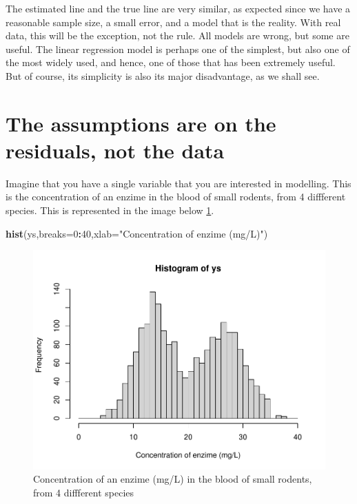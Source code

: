 \documentclass[
]{book}
\newenvironment{Shaded}{\begin{snugshade}}{\end{snugshade}}
\newcommand{\DataTypeTok}[1]{\textcolor[rgb]{0.13,0.29,0.53}{#1}}
\newcommand{\DecValTok}[1]{\textcolor[rgb]{0.00,0.00,0.81}{#1}}
\newcommand{\KeywordTok}[1]{\textcolor[rgb]{0.13,0.29,0.53}{\textbf{#1}}}
\newcommand{\NormalTok}[1]{#1}
\newcommand{\OperatorTok}[1]{\textcolor[rgb]{0.81,0.36,0.00}{\textbf{#1}}}
\newcommand{\StringTok}[1]{\textcolor[rgb]{0.31,0.60,0.02}{#1}}
\begin{document}
The estimated line and the true line are very similar, as expected since we have a reasonable sample size, a small error, and a model that is the reality. With real data, this will be the exception, not the rule. All models are wrong, but some are useful. The linear regression model is perhaps one of the simplest, but also one of the most widely used, and hence, one of those that has been extremely useful. But of course, its simplicity is also its major disadvantage, as we shall see.

\hypertarget{the-assumptions-are-on-the-residuals-not-the-data}{%
\section{The assumptions are on the residuals, not the data}\label{the-assumptions-are-on-the-residuals-not-the-data}}

Imagine that you have a single variable that you are interested in modelling. This is the concentration of an enzime in the blood of small rodents, from 4 diffferent species. This is represented in the image below \ref{fig:figrodents}.

\begin{Shaded}
\begin{Highlighting}[]
\KeywordTok{hist}\NormalTok{(ys,}\DataTypeTok{breaks=}\DecValTok{0}\OperatorTok{:}\DecValTok{40}\NormalTok{,}\DataTypeTok{xlab=}\StringTok{"Concentration of enzime (mg/L)"}\NormalTok{)}
\end{Highlighting}
\end{Shaded}

\begin{figure}

{\centering \includegraphics[width=0.8\linewidth]{ECOMODbook_files/figure-latex/figrodents-1} 

}

\caption{Concentration of an enzime (mg/L) in the blood of small rodents, from 4 diffferent species}\label{fig:figrodents}
\end{figure}
\end{document}
